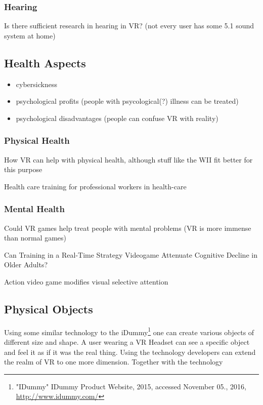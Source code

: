 
\subsubsection{Hearing}
Is there sufficient research in hearing in VR? (not every user has some 5.1 sound system at home)

\subsection{Health Aspects}

\begin{itemize}
	\item cybersickness
	\item psychological profits (people with psycological(?) illness can be treated)
	\item psychological disadvantages (people can confuse VR with reality)
\end{itemize}

\subsubsection{Physical Health}
How VR can help with physical health, although stuff like the WII fit better for this purpose

Health care training for professional workers in health-care

\subsubsection{Mental Health}
Could VR games help treat people with mental problems (VR is more immense than normal games)

Can Training in a Real-Time Strategy Videogame Attenuate Cognitive Decline in Older Adults?

Action video game modifies visual selective attention

\subsection{Physical Objects}

Using some similar technology to the iDummy\footnote{"IDummy" IDummy Product Website, 2015, accessed November 05., 2016, \url{http://www.idummy.com/}} one can create various objects of different size and shape. A user wearing a VR Headset can see a specific object and feel it as if it was the real thing. Using the technology developers can extend the realm of VR to one more dimension. Together with the technology~\cite{Azmandian:2016:HRD:2858036.2858226}


